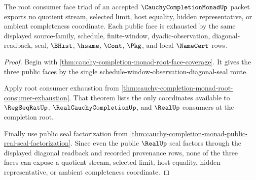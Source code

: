 \begin{theorem}
\label{thm:cauchy-completion-monad-root-face-nonescape}
The root consumer face triad of an accepted $\CauchyCompletionMonadUp$ packet exports no quotient stream, selected limit, host equality, hidden representative, or ambient completeness coordinate. Each public face is exhausted by the same displayed source-family, schedule, finite-window, dyadic-observation, diagonal-readback, seal, $\BHist$, $\hsame$, $\Cont$, $\Pkg$, and local $\NameCert$ rows.
\end{theorem}
\begin{proof}
Begin with \autoref{thm:cauchy-completion-monad-root-face-coverage}. It gives the three public faces by the single schedule-window-observation-diagonal-seal route.

Apply root consumer exhaustion from \autoref{thm:cauchy-completion-monad-root-consumer-exhaustion}. That theorem lists the only coordinates available to $\RegSeqRatUp$, $\RealCauchyCompletionUp$, and $\RealUp$ consumers at the completion root.

Finally use public seal factorization from \autoref{thm:cauchy-completion-monad-public-real-seal-factorization}. Since even the public $\RealUp$ seal factors through the displayed diagonal readback and recorded provenance rows, none of the three faces can expose a quotient stream, selected limit, host equality, hidden representative, or ambient completeness coordinate.
\end{proof}

